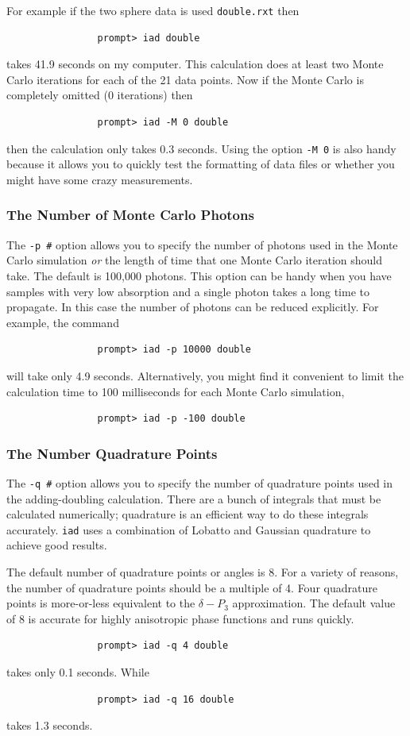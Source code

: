\documentclass{article}
\newcommand\iadprog{\texttt{iad}}
\begin{document}
For example
if the two sphere data is used \texttt{double.rxt} then
\begin{verbatim}
                prompt> iad double
\end{verbatim}
takes 41.9 seconds on my computer.  This calculation does at least two Monte
Carlo iterations for each of the 21 data points.  Now if the Monte Carlo is
completely omitted (0 iterations) then
\begin{verbatim}
                prompt> iad -M 0 double
\end{verbatim}
then the calculation only takes 0.3 seconds.  Using the option \texttt{-M 0} is also
handy because it allows you to quickly test the formatting of data files or
whether you might have some crazy measurements.

\subsubsection{The Number of Monte Carlo Photons}

The \texttt{-p \#} option allows you to specify the number of photons used
in the Monte Carlo simulation \textit{or} the length of time that one Monte
Carlo iteration should take.  The default is 100,000 photons.  
This option can be handy when you have samples with
very low absorption and a single photon takes a long time to propagate.  In
this case the number of photons can be reduced explicitly.  For example, 
the command
\begin{verbatim}
                prompt> iad -p 10000 double
\end{verbatim}
will take only 4.9 seconds.  Alternatively,
you might find it convenient to limit the calculation time to 100 milliseconds
for each Monte Carlo simulation,
\begin{verbatim}
                prompt> iad -p -100 double
\end{verbatim}

\subsubsection{The Number Quadrature Points}
The \texttt{-q \#} option allows you to specify the number of quadrature
points used in the adding-doubling calculation.  There are a bunch of 
integrals that must be calculated numerically; quadrature is an efficient 
way to do these integrals accurately.  \iadprog{} uses a combination of 
Lobatto and Gaussian quadrature to achieve good results.

The default number of quadrature points or angles is 8.
For a variety of reasons, the number of quadrature points should be a
multiple of 4.  Four quadrature points is more-or-less equivalent to the
$\delta-P_3$ approximation.  The default value of 8 is accurate for highly
anisotropic phase functions and runs quickly.
\begin{verbatim}
                prompt> iad -q 4 double
\end{verbatim}
takes only 0.1 seconds.  While
\begin{verbatim}
                prompt> iad -q 16 double
\end{verbatim}
takes 1.3 seconds.
\end{document}
